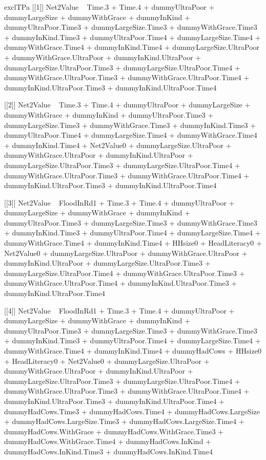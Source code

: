 \begin{Schunk}
\begin{Soutput}
[1] exclTPa
[[1]]
Net2Value ~ Time.3 + Time.4 + dummyUltraPoor + dummyLargeSize + 
    dummyWithGrace + dummyInKind + dummyUltraPoor.Time3 + dummyLargeSize.Time3 + 
    dummyWithGrace.Time3 + dummyInKind.Time3 + dummyUltraPoor.Time4 + 
    dummyLargeSize.Time4 + dummyWithGrace.Time4 + dummyInKind.Time4 + 
    dummyLargeSize.UltraPoor + dummyWithGrace.UltraPoor + dummyInKind.UltraPoor + 
    dummyLargeSize.UltraPoor.Time3 + dummyLargeSize.UltraPoor.Time4 + 
    dummyWithGrace.UltraPoor.Time3 + dummyWithGrace.UltraPoor.Time4 + 
    dummyInKind.UltraPoor.Time3 + dummyInKind.UltraPoor.Time4

[[2]]
Net2Value ~ Time.3 + Time.4 + dummyUltraPoor + dummyLargeSize + 
    dummyWithGrace + dummyInKind + dummyUltraPoor.Time3 + dummyLargeSize.Time3 + 
    dummyWithGrace.Time3 + dummyInKind.Time3 + dummyUltraPoor.Time4 + 
    dummyLargeSize.Time4 + dummyWithGrace.Time4 + dummyInKind.Time4 + 
    Net2Value0 + dummyLargeSize.UltraPoor + dummyWithGrace.UltraPoor + 
    dummyInKind.UltraPoor + dummyLargeSize.UltraPoor.Time3 + 
    dummyLargeSize.UltraPoor.Time4 + dummyWithGrace.UltraPoor.Time3 + 
    dummyWithGrace.UltraPoor.Time4 + dummyInKind.UltraPoor.Time3 + 
    dummyInKind.UltraPoor.Time4

[[3]]
Net2Value ~ FloodInRd1 + Time.3 + Time.4 + dummyUltraPoor + dummyLargeSize + 
    dummyWithGrace + dummyInKind + dummyUltraPoor.Time3 + dummyLargeSize.Time3 + 
    dummyWithGrace.Time3 + dummyInKind.Time3 + dummyUltraPoor.Time4 + 
    dummyLargeSize.Time4 + dummyWithGrace.Time4 + dummyInKind.Time4 + 
    HHsize0 + HeadLiteracy0 + Net2Value0 + dummyLargeSize.UltraPoor + 
    dummyWithGrace.UltraPoor + dummyInKind.UltraPoor + dummyLargeSize.UltraPoor.Time3 + 
    dummyLargeSize.UltraPoor.Time4 + dummyWithGrace.UltraPoor.Time3 + 
    dummyWithGrace.UltraPoor.Time4 + dummyInKind.UltraPoor.Time3 + 
    dummyInKind.UltraPoor.Time4

[[4]]
Net2Value ~ FloodInRd1 + Time.3 + Time.4 + dummyUltraPoor + dummyLargeSize + 
    dummyWithGrace + dummyInKind + dummyUltraPoor.Time3 + dummyLargeSize.Time3 + 
    dummyWithGrace.Time3 + dummyInKind.Time3 + dummyUltraPoor.Time4 + 
    dummyLargeSize.Time4 + dummyWithGrace.Time4 + dummyInKind.Time4 + 
    dummyHadCows + HHsize0 + HeadLiteracy0 + Net2Value0 + dummyLargeSize.UltraPoor + 
    dummyWithGrace.UltraPoor + dummyInKind.UltraPoor + dummyLargeSize.UltraPoor.Time3 + 
    dummyLargeSize.UltraPoor.Time4 + dummyWithGrace.UltraPoor.Time3 + 
    dummyWithGrace.UltraPoor.Time4 + dummyInKind.UltraPoor.Time3 + 
    dummyInKind.UltraPoor.Time4 + dummyHadCows.Time3 + dummyHadCows.Time4 + 
    dummyHadCows.LargeSize + dummyHadCows.LargeSize.Time3 + dummyHadCows.LargeSize.Time4 + 
    dummyHadCows.WithGrace + dummyHadCows.WithGrace.Time3 + dummyHadCows.WithGrace.Time4 + 
    dummyHadCows.InKind + dummyHadCows.InKind.Time3 + dummyHadCows.InKind.Time4


\end{Soutput}
\end{Schunk}
